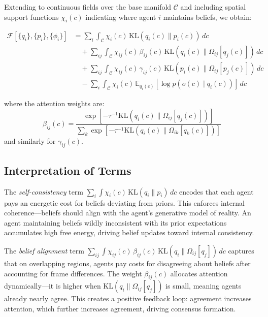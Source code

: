 \documentclass[11pt]{article}
\begin{document}
Extending to continuous fields over the base manifold $\mathcal{C}$ and including spatial support functions $\chi_i(c)$ indicating where agent $i$ maintains beliefs, we obtain:

\begin{equation}
\boxed{
\begin{aligned}
\mathcal{F}[\{q_i\}, \{p_i\}, \{\phi_i\}]
&= \sum_i \int_{\mathcal{C}} \chi_i(c) \, \mathrm{KL}(q_i(c) \| p_i(c)) \, dc \\
&\quad + \sum_{ij} \int_{\mathcal{C}} \chi_{ij}(c) \, \beta_{ij}(c) \, \mathrm{KL}(q_i(c) \| \Omega_{ij}[q_j(c)]) \, dc \\
&\quad + \sum_{ij} \int_{\mathcal{C}} \chi_{ij}(c) \, \gamma_{ij}(c) \, \mathrm{KL}(p_i(c) \| \Omega_{ij}[p_j(c)]) \, dc \\
&\quad - \sum_i \int_{\mathcal{C}} \chi_i(c) \, \mathbb{E}_{q_i(c)}[\log p(o(c) \mid q_i(c))] \, dc
\end{aligned}
}
\label{eq:free_energy}
\end{equation}

where the attention weights are:
\begin{equation}
\beta_{ij}(c) = \frac{\exp\left[-\tau^{-1}\mathrm{KL}(q_i(c) \| \Omega_{ij}[q_j(c)])\right]}{\sum_k \exp\left[-\tau^{-1}\mathrm{KL}(q_i(c) \| \Omega_{ik}[q_k(c)])\right]}
\label{eq:attention}
\end{equation}
and similarly for $\gamma_{ij}(c)$.

\subsection{Interpretation of Terms}

The \emph{self-consistency} term $\sum_i \int \chi_i(c) \, \mathrm{KL}(q_i \| p_i) \, dc$ encodes that each agent pays an energetic cost for beliefs deviating from priors. This enforces internal coherence---beliefs should align with the agent's generative model of reality. An agent maintaining beliefs wildly inconsistent with its prior expectations accumulates high free energy, driving belief updates toward internal consistency.

The \emph{belief alignment} term $\sum_{ij} \int \chi_{ij}(c) \, \beta_{ij}(c) \, \mathrm{KL}(q_i \| \Omega_{ij}[q_j]) \, dc$ captures that on overlapping regions, agents pay costs for disagreeing about beliefs after accounting for frame differences. The weight $\beta_{ij}(c)$ allocates attention dynamically---it is higher when $\mathrm{KL}(q_i \| \Omega_{ij}[q_j])$ is small, meaning agents already nearly agree. This creates a positive feedback loop: agreement increases attention, which further increases agreement, driving consensus formation.
\end{document}
